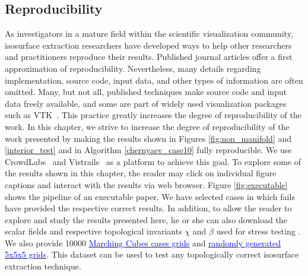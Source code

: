 \subsection{Reproducibility}

As investigators in a mature field within the scientific visualization community, isosurface extraction researchers have developed ways to help other researchers and practitioners reproduce their results. Published journal articles offer a first approximation of reproducibility. Nevertheless, many details regarding implementation, source code, input data, and other types of information are often omitted. Many, but not all, published techniques make source code and input data freely available, and some are part of widely used visualization packages such as VTK~\cite{vtk}. This practice greatly increases the degree of reproducibility of the work. 
In this chapter, we strive to increase the degree of reproducibility of the work presented by making the results shown in Figures \ref{fig:non_manifold} and \ref{interior_test} and in Algorithm \ref{chernyaev_case10} fully reproducible. We use CrowdLabs~\cite{Tohline:2010jn} and Vistrails~\cite{Freire:2006va, Silva:2007:PVR:1300781.1302461} as a platform to achieve this goal. To explore some of the results shown in this chapter, the  reader may click on individual figure captions and interact with the results via web browser. Figure \ref{fig:executable} shows the pipeline of an executable paper. 
%
We have selected cases in which \mc{} fails have provided the respective correct results. In addition,  to allow the reader to explore and study the results presented here, he or she can also download the scalar fields and respective topological invariants $\chi$ and $\beta$ used for stress testing \mc. We also provide 10000 \href{http://dl.dropbox.com/u/8414964/C-MC33/MarchingCubes_cases.zip}{\textcolor{blue}{Marching Cubes cases grids}} and \href{http://dl.dropbox.com/u/8414964/C-MC33/Closed_Surfaces.zip}{\textcolor{blue}{randomly generated 5x5x5 grids}}. This dataset can be used to test any topologically correct isosurface extraction technique.



